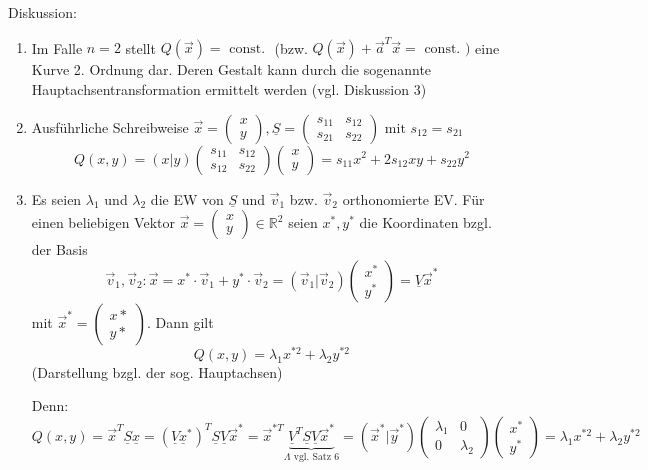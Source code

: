 \documentclass[a4paper]{scrartcl}
\begin{document}
Diskussion:
\begin{enumerate}
\item Im Falle $n=2$ stellt $Q(\vec{x} ) = \text{ const. }$ (bzw. $ Q(\vec{x}) + \vec{a}^T \vec{x} = \text{ const. } )$ eine Kurve 2. Ordnung dar. Deren Gestalt kann durch die sogenannte Hauptachsentransformation ermittelt werden (vgl. Diskussion 3)
\item Ausführliche Schreibweise $\vec{x} = \begin{pmatrix} x \\y \end{pmatrix}, \underline{S} = \begin{pmatrix} s_{11} & s_{12}\\ s_{21} & s_{22} \end{pmatrix} \text{ mit } s_{12} = s_{21}$
\begin{equation}\label{Def14D2}
Q(x,y) = (x|y) \begin{pmatrix} s_{11} & s_{12} \\ s_{12} & s_{22} \end{pmatrix} \begin{pmatrix} x \\ y \end{pmatrix} = s_{11}x^2 + 2 s_{12} xy + s_{22} y^2
\end{equation}
\item Es seien $\lambda_1$ und $\lambda_2$ die EW von $\underline{S}$ und $\vec{v}_1$ bzw. $\vec{v}_2$ orthonomierte EV. Für einen beliebigen Vektor $\vec{x} = \begin{pmatrix} x \\y \end{pmatrix} \in \mathbb{R}^2$ seien $x^*,y^*$ die Koordinaten bzgl. der Basis 
\begin{equation} \label{Def14D31} \vec{v}_1,\vec{v}_2 : \vec{x} = x^* \cdot \vec{v}_1 + y^* \cdot \vec{v}_2 = (\vec{v}_1|\vec{v}_2 ) \begin{pmatrix} x^* \\ y^* \end{pmatrix} = \underline{V} \vec{x}^*
\end{equation} mit $\vec{x}^* = \begin{pmatrix} x* \\ y* \end{pmatrix}$. Dann gilt
\begin{equation}\label{Def14D32}
Q(x,y) = \lambda_1 x^{*2} + \lambda_2 y^{*2}
\end{equation} (Darstellung bzgl. der sog. Hauptachsen)

Denn: $Q(x,y) = \vec{x}^T \underline{S} \underline{x} = (\underline{V} \underline{x}^*)^T \underline{S} \underline{V} \vec{x}^* = \vec{x}^{*T} \underbrace{\underline{V}^T  \underline{S} \underline{V} \vec{x}^*}_{\Lambda \text{ vgl. Satz 6}} = (\vec{x}^* | \vec{y}^* ) \begin{pmatrix} \lambda_1 & 0 \\ 0 & \lambda_2 \end{pmatrix} \begin{pmatrix} x^* \\ y^* \end{pmatrix} = \lambda_1 x^{*2} + \lambda_2 y^{*2}$
\end{enumerate}
\end{document}
